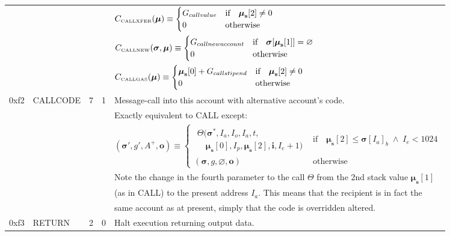 \documentclass[9pt,oneside]{amsart}
\begin{document}
\begin{tabular*}{\columnwidth}[h]{rlrrl}
&&&& $C_{\text{\tiny CALLXFER}}(\boldsymbol{\mu}) \equiv \begin{cases}
G_{callvalue} & \text{if} \quad \boldsymbol{\mu}_\mathbf{s}[2] \neq 0 \\
0 & \text{otherwise}
\end{cases}$ \\
&&&& $C_{\text{\tiny CALLNEW}}(\boldsymbol{\sigma}, \boldsymbol{\mu}) \equiv \begin{cases}
G_{callnewaccount} & \text{if} \quad \boldsymbol{\sigma}[\boldsymbol{\mu}_\mathbf{s}[1]] = \varnothing \\
0 & \text{otherwise}
\end{cases}$ \\
&&&& $C_{\text{\tiny CALLGAS}}(\boldsymbol{\mu}) \equiv  \begin{cases}
\boldsymbol{\mu}_\mathbf{s}[0] + G_{callstipend} & \text{if} \quad \boldsymbol{\mu}_\mathbf{s}[2] \neq 0 \\
0 & \text{otherwise}
\end{cases}$ \\
\midrule
0xf2 & {\small CALLCODE} & 7 & 1 & Message-call into this account with alternative account's code. \\
&&&& Exactly equivalent to {\small CALL} except: \\
&&&& $(\boldsymbol{\sigma}', g', A^+, \mathbf{o}) \equiv \begin{cases}\begin{array}{l}\Theta(\boldsymbol{\sigma}^*, I_a, I_o, I_a, t,\\\quad \boldsymbol{\mu}_\mathbf{s}[0], I_p, \boldsymbol{\mu}_\mathbf{s}[2], \mathbf{i}, I_e + 1)\end{array} & \text{if} \quad \boldsymbol{\mu}_\mathbf{s}[2] \leqslant \boldsymbol{\sigma}[I_a]_b \;\wedge\; I_e < 1024 \\ (\boldsymbol{\sigma}, g, \varnothing, \mathbf{o}) & \text{otherwise} \end{cases}$ \\
&&&& Note the change in the fourth parameter to the call $\Theta$ from the 2nd stack value $\boldsymbol{\mu}_\mathbf{s}[1]$\\
&&&& (as in {\small CALL}) to the present address $I_a$. This means that the recipient is in fact the\\
&&&& same account as at present, simply that the code is overridden altered.\\
\midrule
0xf3 & {\small RETURN} & 2 & 0 & Halt execution returning output data. \\

\end{tabular*}
\end{document}
